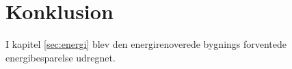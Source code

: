 \chapter{Konklusion}

I kapitel \ref{sec:energi} blev den energirenoverede bygnings forventede energibesparelse udregnet.